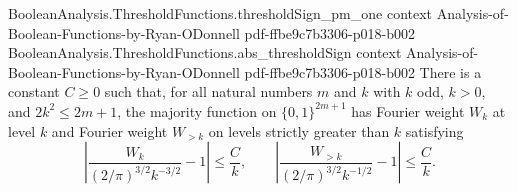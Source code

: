 \begin{theorem}
  {BooleanAnalysis.ThresholdFunctions.thresholdSign_pm_one}
  {context}
  {Analysis-of-Boolean-Functions-by-Ryan-ODonnell}
  {pdf-ffbe9c7b3306-p018-b002}
\proofstep
  {BooleanAnalysis.ThresholdFunctions.abs_thresholdSign}
  {context}
  {Analysis-of-Boolean-Functions-by-Ryan-ODonnell}
  {pdf-ffbe9c7b3306-p018-b002}
There is a constant $C\ge 0$ such that, for all natural numbers $m$ and $k$ with $k$
odd, $k>0$, and $2k^2\le 2m+1$, the majority function on $\{0,1\}^{2m+1}$ has Fourier
weight $W_k$ at level $k$ and Fourier weight $W_{>k}$ on levels strictly greater than
$k$ satisfying
\[
\left|\frac{W_k}{(2/\pi)^{3/2}k^{-3/2}}-1\right|\le \frac{C}{k},\qquad
\left|\frac{W_{>k}}{(2/\pi)^{3/2}k^{-1/2}}-1\right|\le \frac{C}{k}.
\]
\end{theorem}
